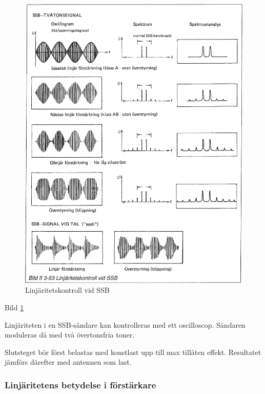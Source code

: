 \begin{figure}[h]
\begin{center}
\includegraphics[width=14cm]{images/bild_2_3-53}
\caption{Linjäritetskontroll vid SSB}
\label{fig:BildII3-53}
\end{center}
\end{figure}

Bild \ref{fig:BildII3-53}

Linjäriteten i en SSB-sändare kan kontrolleras med ett
oscilloscop. Sändaren moduleras då med två övertonsfria toner.

Slutsteget bör först belastas med konstlast upp till max tillåten
effekt. Resultatet jämförs därefter med antennen som last.

\subsubsection{Linjäritetens betydelse i förstärkare}


